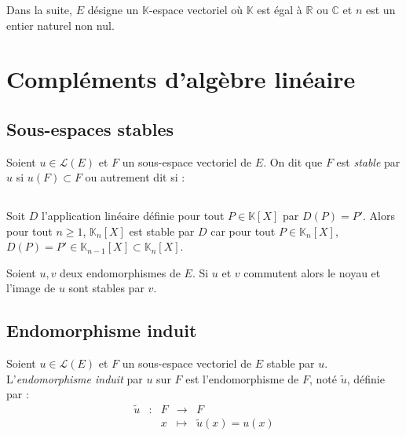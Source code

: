 \documentclass[a4paper,10pt]{report}
\begin{document}


\noindent Dans la suite, $E$ désigne un $\mathbb{K}$-espace vectoriel où $\mathbb{K}$ est égal à $\mathbb{R}$ ou $\mathbb{C}$ et $n$ est un entier naturel non nul.

\medskip

\section{Compléments d'algèbre linéaire}
\subsection{Sous-espaces stables}         
\begin{defin} Soient $u \in \mathcal{L}(E)$ et $F$ un sous-espace vectoriel de $E$. On dit que $F$ est \textit{stable} par $u$ si $u(F) \subset F$ ou autrement dit si :
$$\phantom{ \forall x \in F, \; u(x) \in F}$$
\end{defin}

\begin{ex} Soit $D$ l'application linéaire définie pour tout $P \in \mathbb{K}[X]$ par $D(P)=P'$. Alors pour tout $n \geq 1$, $\mathbb{K}_n[X]$ est stable par $D$ car pour tout $P \in \mathbb{K}_n[X]$, $D(P)=P' \in  \mathbb{K}_{n-1}[X] \subset  \mathbb{K}_n[X]$.
\end{ex}

\medskip


\begin{prop} Soient $u,v$ deux endomorphismes de $E$. Si $u$ et $v$ commutent alors le noyau et l'image de $u$ sont stables par $v$.
\end{prop}

\begin{preuve}
\vspace{5.5cm}
\end{preuve}

\subsection{Endomorphisme induit}

\begin{defin}  Soient $u \in \mathcal{L}(E)$ et $F$ un sous-espace vectoriel de $E$ stable par $u$. L'\textit{endomorphisme induit} par $u$ sur $F$ est l'endomorphisme de $F$, noté $\tilde{u}$, définie par :
$$ \begin{array}{cclll}
\tilde{u} & : & F & \rightarrow & F \\
& & x & \mapsto & \tilde{u}(x)=u(x)\\
\end{array}$$
\end{defin}
\end{document}
